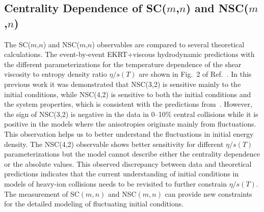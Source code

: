\subsection{Centrality Dependence of SC($m$,$n$) and NSC($m$,$n$)}
\label{sec:theory_allorder}
The SC($m$,$n$) and NSC($m$,$n$) observables are compared to several theoretical calculations. The event-by-event EKRT+viscous hydrodynamic predictions with the different parameterizations for the temperature dependence of the shear viscosity to entropy density ratio $\eta/s(T)$ are shown in Fig.~2 of Ref.~\cite{ALICE:2016kpq}. 
In this previous work it was demonstrated that NSC(3,2) is sensitive mainly to the initial conditions, while NSC(4,2) is sensitive to both the initial conditions and the system properties, which is consistent with the predictions from~\cite{Niemi:2012aj}.
However, the sign of NSC(3,2) is negative in the data in 0--10\% central collisions while it is positive in the models where the anisotropies originate mainly from fluctuations.
This observation helps us to better understand the fluctuations in initial energy density.
The NSC(4,2) observable shows better sensitivity for different $\eta/s(T)$ parameterizations but the model cannot describe either the centrality dependence or the absolute values. This observed discrepancy between data and theoretical predictions indicates that the current understanding of initial conditions in models of heavy-ion collisions needs to be revisited to further constrain $\eta/s(T)$.
The measurement of SC$(m,n)$ and NSC$(m,n)$ can provide new constraints for the detailed modeling of fluctuating initial conditions.

